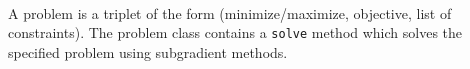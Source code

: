 \\
A problem is a triplet of the form (minimize/maximize, objective, list of
constraints). The problem class contains a \verb'solve' method which
solves the specified problem using subgradient methods.

